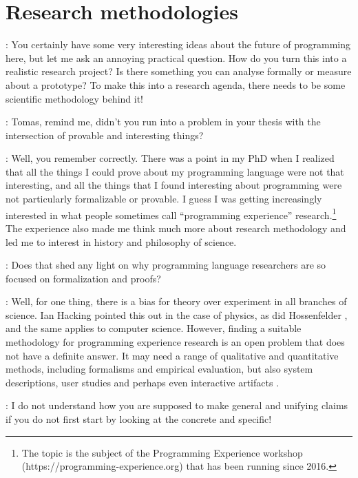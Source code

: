 \documentclass[runningheads]{llncs}
\newcommand{\T}{Tomas}
\newcommand{\J}{Joel}
\newcommand{\says}[2][gg]{\vspace{0.5em}\noindent\hangindent=0.5cm{\textsc{#1}}: #2}
\begin{document}
\section{Research methodologies}

\says[\T]{You certainly have some very interesting ideas about the future of programming here, but let me ask an annoying practical question. How do you turn this into a realistic research project? Is there something you can analyse formally or measure about a prototype? To make this into a research agenda, there needs to be some scientific methodology behind it!}

\says[\J]{Tomas, remind me, didn't you run into a problem in your thesis with the intersection of provable and interesting things?}

\says[\T]{Well, you remember correctly. There was a point in my PhD when I realized that all the things I could prove about my programming language were not that interesting, and all the things that I found interesting about programming were not particularly formalizable or provable. I guess I was getting increasingly interested in what people sometimes call ``programming experience'' research.\footnote{The topic is the subject of the Programming Experience workshop\\ (https://programming-experience.org) that has been running since 2016.} The experience also made me think much more about research methodology and led me to interest in history and philosophy of science.}

\says[\J]{Does that shed any light on why programming language researchers are so focused on formalization and proofs?}

\says[\T]{Well, for one thing, there is a bias for theory over experiment in all branches of science. Ian Hacking \cite{hacking-1983-representing} pointed this out in the case of physics, as did Hossenfelder \cite{2018-hossenfelder-lost}, and the same applies to computer science. However, finding a suitable methodology for programming experience research is an open problem that does not have a definite answer. It may need a range of qualitative and quantitative methods, including formalisms and empirical evaluation, but also system descriptions, user studies and perhaps even interactive artifacts \cite{edwards-2019-eval}.}

\says[\J]{I do not understand how you are supposed to make general and unifying claims if you do not first start by looking at the concrete and specific!}
\end{document}
